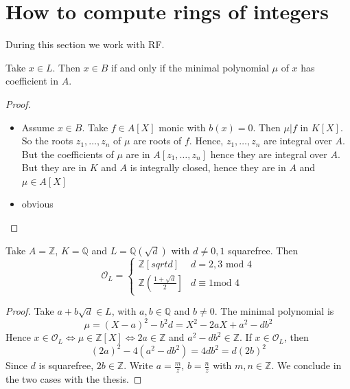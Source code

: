 \section{How to compute rings of integers}
During this section we work with RF.
\begin{proposition}{}
    Take \(x \in L\). Then \(x \in B\) if and only if the minimal polynomial
    \(\mu\) of \(x\) has coefficient in \(A\).
\end{proposition}
\begin{proof}\( \)
\begin{itemize}
    \item[\(\implies \)] Assume \(x \in B\). Take \(f \in A[X]\) monic with
        \(b(x) = 0\). Then \(\mu | f\) in \(K[X]\). So the roots \(z_{1}, \dots,
        z_{n}\) of \(\mu\) are roots of \(f\). Hence, \(z_{1}, \dots, z_{n}\)
        are integral over \(A\). But the coefficients of \(\mu\) are in
        \(A[z_{1}, \dots, z_{n}]\) hence they are integral over \(A\). But they
        are in \(K\) and \(A\) is integrally closed, hence they are in \(A\) and
        \(\mu \in A[X]\) 
    \item[\(\impliedby \)] obvious
\end{itemize}
\end{proof}

\begin{corollary}{}
    Take \(A = \mathbb{Z}\), \(K = \mathbb{Q}\) and \(L = \mathbb{Q}(\sqrt{d})\)
    with \(d \neq 0,1\) squarefree. Then
    \[
      \mathcal{O}_L = \begin{cases}{}
          \mathbb{Z}[sqrt{d}] & d = 2, 3 \text{ mod } 4\\
          \mathbb{Z}{\left(\frac{1 + \sqrt{d}}{2}  \right]} & d \equiv 1 \text{
          mod } 4
      \end{cases}
    \]
\end{corollary}
\begin{proof}{}
    Take \(a + b \sqrt{d} \in L\), with \(a, b \in \mathbb{Q}\) and \(b \neq
    0\). The minimal polynomial is 
    \[
      \mu = {(X - a)}^2 - b^2d = X^2 - 2aX + a^2 - db^2 
    \]
    Hence \(x \in \mathcal{O}_L \iff \mu \in \mathbb{Z}[X] \iff 2a \in
    \mathbb{Z}\) and \(a^2 - db^2 \in \mathbb{Z}\).
    If \(x \in \mathcal{O}_L\), then
    \[
      {(2a)}^2 - 4 {(a^2 - db^2)} = 4db^2 = d{(2b)}^2
    \]
    Since \(d\) is squarefree, \(2b \in \mathbb{Z}\). Write \(a = \frac{m}{z}\),
    \(b = \frac{n}{z}\) with \(m, n \in \mathbb{Z}\). We conclude in the two
    cases with the thesis.
\end{proof}

